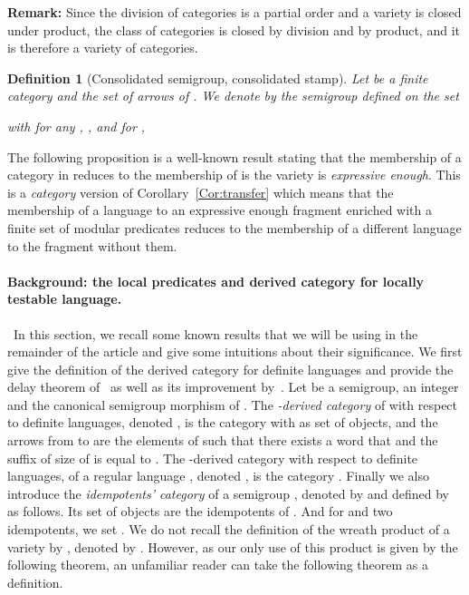 \documentclass[submission,hidelink]{dmtcs-episciences}
\newtheorem{definition}[theorem]{Definition}
\begin{document}
	\noindent\textbf{Remark:} Since the division of categories is a partial order and a variety is closed under product, the class of categories  is closed by division and by product, and it is therefore a variety of categories.

	\begin{definition}[Consolidated semigroup, consolidated stamp]
			Let  be a finite category and 
			the set of arrows of . We denote by  the semigroup
			defined on the set
			
			with   for any , , and for ,
			
	\end{definition}
	The following proposition is a well-known result stating that the membership of a category
	in  reduces to the membership of  is the variety is \emph{expressive enough}. This is a
	\emph{category} version of Corollary~\ref{Cor:transfer} which means that the membership of a language to an expressive enough fragment enriched with a finite set of modular predicates reduces to the membership of a different language to the fragment without them.
\paragraph{Background: the local predicates and derived category for locally testable language.}
	\
		In this section, we recall some known results that we will be using in the remainder of the article and give some intuitions about their significance.
		We first give the definition of the derived category for definite languages and provide
		the delay theorem of~\cite{Straubing85} as well as its improvement
		by~\cite{Tilson}.
			Let  be a semigroup,  an integer and  the canonical semigroup morphism
			of .
			The \emph{-derived category} of  with respect to definite languages, denoted , is
			the category with  as set of objects,
			and the arrows from  to  are the elements  of  such
			that there exists a word  that  and  the
			suffix of size  of  is equal to .
			The -derived category with respect to definite languages, of a regular language ,
			denoted , is the category .
		Finally we also introduce the \emph{idempotents' category} of a semigroup , denoted by
		 and defined by~\cite{Tilson} as follows. Its set of objects are
		the idempotents of . And for  and  two idempotents, we set .
		We do not recall the definition of the wreath product of a variety  by , denoted by
		.
		However, as our only use of this product is given by the following theorem, an unfamiliar reader can take
		the following theorem as a definition.
\end{document}
